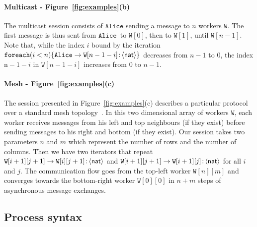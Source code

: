 \documentclass{LMCS}
\newcommand{\kf}[1]{\textup{\textsf{#1}}\xspace}
\newcommand{\Nat}{\kf{nat}}
\newcommand{\ENCan}[1]{\langle #1 \rangle}
\newcommand{\TO}[2]{#1\to #2}
\newcommand{\GS}[3]{\TO{#1}{#2}\colon \!\ENCan{#3}}
\newcommand{\ii}{\ensuremath{i}}
\newcommand{\jj}{\ensuremath{j}}
\newcommand{\n}{\ensuremath{\mathrm{n}}}
\newcommand{\Alice}{\ensuremath{\mathtt{Alice}}}
\newcommand{\W}{\ensuremath{\mathtt{W}}}
\newcommand{\FOREACH}[3]{\ensuremath{\mathtt{foreach}(#1 #2)\{#3\}}}
\begin{document}
\paragraph{\bf Multicast - Figure~\ref{fig:examples}(b)}
The multicast session consists of $\Alice$ sending a message to $n$
workers \W. The first message is thus sent from \Alice\ to $\W[0]$,
then to $\W[1]$, until $\W[n-1]$.  
Note that, while the index $\ii$ bound by the iteration
$\FOREACH{i}{<n}{\GS{\Alice}{\W[n-1-\ii]}{\Nat}}$ decreases from 
$n-1$ to $0$, the index $\n-1-\ii$ in $\W[n-1-\ii]$ increases from $0$ to
$n-1$. 


\paragraph{\bf Mesh  - Figure~\ref{fig:examples}(c)}
The session presented in Figure~\ref{fig:examples}(c) describes a particular
protocol over a standard mesh topology~\cite{FThomson}. In this two dimensional
array of workers \W, each worker receives messages from his left and top
neighbours (if they exist) before sending messages to his right and bottom (if
they exist). Our session takes two parameters $n$ and $m$ which represent the
number of rows and the number of columns. Then we have two iterators that repeat
$\GS{\W[\ii+1][\jj+1]}{\W[\ii][\jj+1]}{\Nat}$ and
$\GS{\W[\ii+1][\jj+1]}{\W[\ii+1][\jj]}{\Nat}$ for all $\ii$ and $\jj$. The communication flow goes from the top-left worker $\W[n][m]$ and
converges towards the bottom-right worker $\W[0][0]$ 
in $n+m$ steps of asynchronous message exchanges.


\subsection{Process syntax}
\label{sec:usersyntax}
\end{document}

